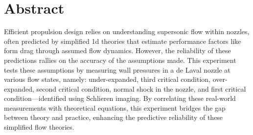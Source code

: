 \thispagestyle{plain} %



\chapter*{Abstract} %

Efficient propulsion design relies on understanding supersonic flow within nozzles, often predicted by simplified \acrfull{1d} theories that estimate performance factors like form drag through assumed flow dynamics. However, the reliability of these predictions rallies on the accuracy of the assumptions made. This experiment tests these assumptions by measuring wall pressures in a de Laval nozzle at various flow states, namely: under-expanded, third critical condition, over-expanded, second critical condition, normal shock in the nozzle, and first critical condition—identified using Schlieren imaging. By correlating these real-world measurements with theoretical equations, this experiment bridges the gap between theory and practice, enhancing the predictive reliability of these simplified flow theories. 



